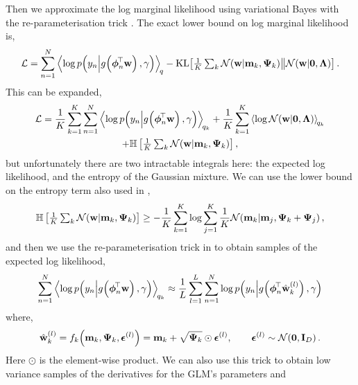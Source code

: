\documentclass[11pt, oneside]{article}
\begin{document}
Then we approximate the log marginal likelihood using variational Bayes with
the re-parameterisation trick \citep{kingma2014auto}. The exact lower bound on
log marginal likelihood is,
\begin{equation}
    \elbo = \sum^N_{n=1} 
    \expec{q}{\log\probC{\targs_n}{\activ{\feats_n\T\weights}, \lparam}}
    - \KL{\textstyle\frac{1}{K}\textstyle\sum_{k}
            \gausC{\weights}{\pomean_k, \dpocov_k}}
        {\gausC{\weights}{\mathbf{0}, \Reg}}.
    \label{eq:glmobj}
\end{equation}
This can be expanded,
\begin{multline}
    \elbo = \frac{1}{K} \sum^K_{k=1} \sum^N_{n=1} 
    \expec{q_k}{\log\probC{\targs_n}
        {\activ{\feats_n\T\weights}, \lparam}}
    + \frac{1}{K} \sum^K_{k=1}
        \expec{q_k}{\log\gausC{\weights}{\mathbf{0}, \Reg}} \\
    + \entropy{\textstyle\frac{1}{K}\textstyle\sum_{k}
            \gausC{\weights}{\pomean_k, \dpocov_k}},
    \label{eq:glmobj_exp}
\end{multline}
but unfortunately there are two intractable integrals here: the expected log
likelihood, and the entropy of the Gaussian mixture. We can use the lower bound
on the entropy term also used in \citet{gershman2012, nguyen2014automated},
\begin{equation}
    \entropy{\textstyle\frac{1}{K}\textstyle\sum_{k}
        \gausC{\weights}{\pomean_k, \dpocov_k}} \geq
    - \frac{1}{K} \sum_{k=1}^K \log \sum_{j=1}^K \frac{1}{K}
    \gausC{\pomean_k}{\pomean_j, \dpocov_k + \dpocov_j},
\end{equation}
and then we use the re-parameterisation trick in \citet{kingma2014auto} to 
obtain samples of the expected log likelihood,
\begin{equation}
    \sum^N_{n=1} 
    \expec{q_k}{\log\probC{\targs_n}
        {\activ{\feats_n\T\weights}, \lparam}} \approx
    \frac{1}{L} \sum^{L}_{l=1} \sum^N_{n=1} \log\probC{\targs_n}
    {\activ{\feats_n\T\hat{\weights}_k^{\brac{l}}}, \lparam}
\end{equation}
where,
\begin{equation}
    \hat{\weights}_k^{\brac{l}} =
    \func{f}{\pomean_k, \dpocov_k, \resamp^{(l)}}{k} =
    \pomean_k + \sqrt{\dpocov_k} \odot \resamp^{(l)},
    \qquad \resamp^{(l)} \sim \gaus{\mathbf{0}, \ident{D}}.
\end{equation}
Here $\odot$ is the element-wise product. We can also use this trick to obtain
low variance samples of the derivatives for the GLM's parameters and
\end{document}
